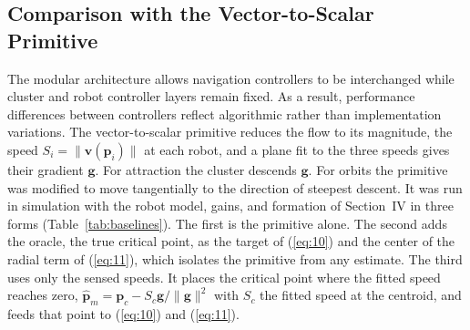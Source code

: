 
\subsection{Comparison with the Vector-to-Scalar Primitive}

The modular architecture allows navigation controllers to be interchanged while cluster and robot controller layers remain fixed. As a result, performance differences between controllers reflect algorithmic rather than implementation variations. %
The vector-to-scalar primitive \cite{48} reduces the flow to its magnitude, the speed $S_i = \|\mathbf{v}(\mathbf{p}_i)\|$ at each robot, and a plane fit to the three speeds gives their gradient $\mathbf{g}$. For attraction the cluster descends $\mathbf{g}$. For orbits the primitive was modified to move tangentially to the direction of steepest descent. It was run in simulation with the robot model, gains, and formation of Section~IV in three forms (Table~\ref{tab:baselines}). The first is the primitive alone. The second adds the oracle, the true critical point, as the target of (\ref{eq:10}) and the center of the radial term of (\ref{eq:11}), which isolates the primitive from any estimate. The third uses only the sensed speeds. It places the critical point where the fitted speed reaches zero, $\hat{\mathbf{p}}_m = \mathbf{p}_c - S_c\mathbf{g}/\|\mathbf{g}\|^2$ with $S_c$ the fitted speed at the centroid, and feeds that point to (\ref{eq:10}) and (\ref{eq:11}).

